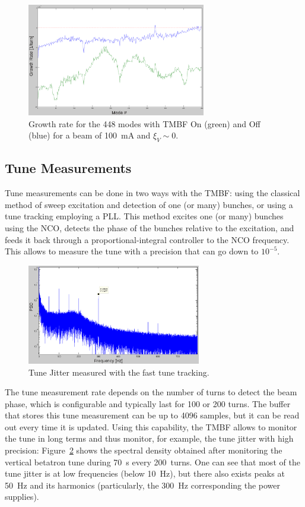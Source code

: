 \documentclass[a4paper,
              ]{jacow}
\begin{document}
\begin{figure}[hbt!]
   \centering
   \includegraphics[width=78mm]{img/TUPB046f7}
   \caption{Growth rate for the 448 modes with TMBF On (green) and Off (blue) for a beam of 100~mA and $\xi_V\sim 0$.}
   \label{damping:modes}
\end{figure}

\subsection{Tune Measurements}

Tune measurements can be done in two ways with the TMBF: using the classical method of sweep excitation and detection of one (or many) bunches, or using a tune tracking employing a PLL. This method excites one (or many) bunches using the NCO, detects the phase of the bunches relative to the excitation, and feeds it back through a proportional-integral controller to the NCO frequency. This allows to measure the tune with a precision that can go down to $10^{-5}$. 

\begin{figure}[hbt!]
   \centering
   \includegraphics[width=76mm]{img/TUPB046f8}
   \caption{Tune Jitter measured with the fast tune tracking.}
   \label{tune:jitter}
\end{figure}

The tune measurement rate depends on the number of turns to detect the beam phase, which is configurable and typically last for 100 or 200 turns. The buffer that stores this tune measurement can be up to 4096 samples, but it can be read out every time it is updated. Using this capability, the TMBF allows to monitor the tune in long terms and thus monitor, for example, the tune jitter with high precision: Figure~\ref{tune:jitter} shows the spectral density obtained after monitoring the vertical betatron tune during 70~s every 200~turns. One can see that most of the tune jitter is at low frequencies (below 10~Hz), but there also exists peaks at 50~Hz and its harmonics (particularly, the 300~Hz corresponding the power supplies). 
\end{document}
